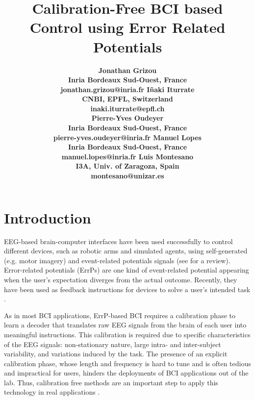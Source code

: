 \documentclass[]{article}
\title{Calibration-Free BCI based Control using Error Related Potentials}
\author{
\bf{Jonathan Grizou} \\ Inria Bordeaux Sud-Ouest, France \\ jonathan.grizou@inria.fr
\And \bf{I\~naki Iturrate} \\ CNBI, EPFL, Switzerland \\ inaki.iturrate@epfl.ch\\
\AND \bf{Pierre-Yves Oudeyer} \\ Inria Bordeaux Sud-Ouest, France \\ pierre-yves.oudeyer@inria.fr
\And \bf{Manuel Lopes} \\ Inria Bordeaux Sud-Ouest, France \\ manuel.lopes@inria.fr
\And \bf{Luis Montesano} \\ I3A, Univ. of Zaragoza, Spain \\ montesano@unizar.es
}
\newcommand{\sectionspace}{\vspace{-0.3cm}}
\begin{document}
\maketitle

% 


\section{Introduction}
\sectionspace

EEG-based brain-computer interfaces have been used successfully to control different devices, such as robotic arms and simulated agents, using self-generated (e.g. motor imagery) and event-related potentials signals (see \cite{millan2010combining} for a review). Error-related potentials (ErrPs) are one kind of event-related potential appearing when the user's expectation diverges from the actual outcome. Recently, they have been used as feedback instructions for devices to solve a user's intended task \cite{chavarriaga2010learning,iturrate2010single}.


As in most BCI applications, ErrP-based BCI requires a calibration phase to learn a decoder  that translates raw EEG signals from the brain of each user into meaningful instructions. This calibration is required due to specific characteristics of the EEG signals: non-stationary nature, large intra- and inter-subject variability, and variations induced by the task. The presence of an explicit calibration phase, whose length and frequency is hard to tune and is often tedious and impractical for users, hinders the deployments of BCI applications out of the lab. Thus, calibration free methods are an important step to apply this technology in real applications \cite{millan2010combining}.
\end{document}
